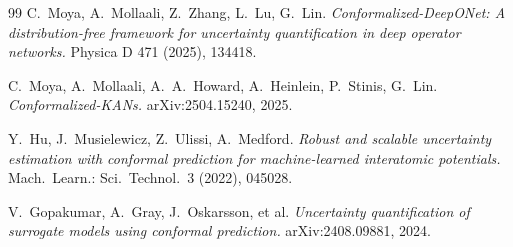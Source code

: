 \documentclass[11pt]{article}
\theoremstyle{definition}
\theoremstyle{remark}
\begin{document}
\begin{thebibliography}{99}
 C.\ Moya, A.\ Mollaali, Z.\ Zhang, L.\ Lu, G.\ Lin.
\emph{Conformalized-DeepONet: A distribution-free framework for uncertainty quantification in deep operator networks.}
Physica D 471 (2025), 134418.

 C.\ Moya, A.\ Mollaali, A.~A.\ Howard, A.\ Heinlein, P.\ Stinis, G.\ Lin.
\emph{Conformalized-KANs.}
arXiv:2504.15240, 2025.

 Y.\ Hu, J.\ Musielewicz, Z.\ Ulissi, A.\ Medford.
\emph{Robust and scalable uncertainty estimation with conformal prediction for machine-learned interatomic potentials.}
Mach.\ Learn.: Sci.\ Technol.\ 3 (2022), 045028.

 V.\ Gopakumar, A.\ Gray, J.\ Oskarsson, et al.
\emph{Uncertainty quantification of surrogate models using conformal prediction.}
arXiv:2408.09881, 2024.

\end{thebibliography}
\end{document}
